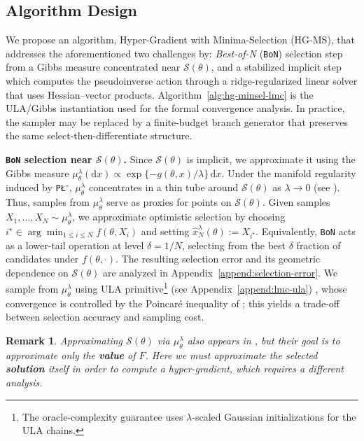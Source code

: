\documentclass{article}
\DeclareRobustCommand{\stagecirc}[1]{%
  \tikz[baseline=(char.base)]{%
    \node[draw,circle,inner sep=0pt,minimum size=1.5ex] (char) {\scriptsize #1};%
  }%
}
\def\d{\delta}
\theoremstyle{normaltheorem}
\newtheorem{remark}[remark]{Remark}
\newcommand{\gibbs}{\mu}
\newcommand{\gibbstheta}{\gibbs_\theta^\lambda}
\newcommand{\PLcirc}{\texttt{P\L$^\circ$}}
\newcommand{\calS}{\mathcal{S}}
\renewcommand{\d}{\mathrm{d}}
\newcommand{\BoN}{\texttt{BoN}\xspace}
\begin{document}
\subsection{Algorithm Design}

We propose an algorithm, Hyper-Gradient with Minima-Selection (\textsc{HG-MS}), that addresses the aforementioned two challenges by: \emph{Best-of-N} (\BoN) selection step from a Gibbs measure concentrated near $\calS(\theta)$, and a stabilized implicit step which computes the pseudoinverse action through a ridge-regularized linear solver that uses Hessian--vector products.
Algorithm~\ref{alg:hg-minsel-lmc} is the ULA/Gibbs instantiation used for the formal convergence analysis. In practice, the sampler may be replaced by a finite-budget branch generator that preserves the same select-then-differentiate structure.

\textbf{\stagecirc{A} \BoN selection near $\calS(\theta)$.}
Since $\calS(\theta)$ is implicit, we approximate it using the Gibbs measure $\gibbstheta(\d x)\propto \exp\{-g(\theta,x)/\lambda\}\,\d x$.
Under the manifold regularity induced by \PLcirc, $\gibbs_\theta^\lambda$ concentrates in a thin tube around $\calS(\theta)$ as $\lambda\to 0$ (see ). Thus, samples from $\gibbstheta$ serve as proxies for points on $\calS(\theta)$.
Given samples $X_1,\ldots,X_N\sim\gibbstheta$, we approximate optimistic selection by choosing $i^\star\in\arg\min_{1\le i\le N} f(\theta,X_i)$ and setting $\hat{x}_N^\lambda(\theta):=X_{i^\star}$.
Equivalently, \BoN acts as a lower-tail operation at level $\delta=1/N$, selecting from the best $\delta$ fraction of candidates under $f(\theta,\cdot)$. The resulting selection error and its geometric dependence on $\calS(\theta)$ are analyzed in Appendix~\ref{append:selection-error}. We sample from $\gibbstheta$ using ULA primitive\footnote{The oracle-complexity guarantee uses \(\lambda\)-scaled Gaussian initializations for the ULA chains.} (see Appendix~\ref{append:lmc-ula}) \citep{chewi2024analysis}, whose convergence is controlled by the Poincar\'e inequality of \citep{gong2024poincare}; this yields a trade-off between selection accuracy and sampling cost.

\begin{remark}
Approximating $\calS(\theta)$ via $\gibbstheta$ also appears in \citep{masiha2025superquantile}, but their goal is to approximate only the \textbf{value} of $F$. Here we must approximate the selected \textbf{solution} itself in order to compute a hyper-gradient, which requires a different analysis.
\end{remark}
\end{document}
